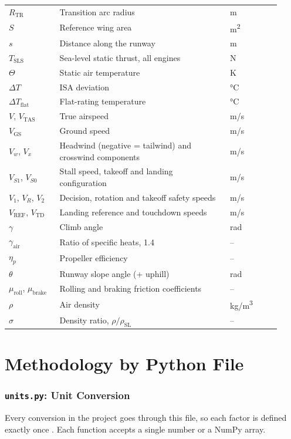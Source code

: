 \documentclass[11pt,letterpaper]{article}
\numberwithin{equation}{section}
\newcommand{\code}[1]{\textmd{\texttt{#1}}}
\begin{document}
\begin{longtable}{@{}p{0.17\linewidth}p{0.58\linewidth}p{0.17\linewidth}@{}}
$R_\text{TR}$ & Transition arc radius & \si{m}\\
$S$ & Reference wing area & \si{m^2}\\
$s$ & Distance along the runway & \si{m}\\
$T_\text{SLS}$ & Sea-level static thrust, all engines & \si{N}\\
$\Theta$ & Static air temperature & \si{K}\\
$\Delta T$ & ISA deviation & \si{\celsius}\\
$\Delta T_\text{flat}$ & Flat-rating temperature & \si{\celsius}\\
$V$, $V_\text{TAS}$ & True airspeed & \si{m/s}\\
$V_\text{GS}$ & Ground speed & \si{m/s}\\
$V_w$, $V_x$ & Headwind (negative = tailwind) and crosswind components & \si{m/s}\\
$V_{S1}$, $V_{S0}$ & Stall speed, takeoff and landing configuration & \si{m/s}\\
$V_1$, $V_R$, $V_2$ & Decision, rotation and takeoff safety speeds & \si{m/s}\\
$V_\text{REF}$, $V_\text{TD}$ & Landing reference and touchdown speeds & \si{m/s}\\
$\gamma$ & Climb angle & \si{rad}\\
$\gamma_\text{air}$ & Ratio of specific heats, 1.4 & --\\
$\eta_p$ & Propeller efficiency & --\\
$\theta$ & Runway slope angle (+ uphill) & \si{rad}\\
$\mu_\text{roll}$, $\mu_\text{brake}$ & Rolling and braking friction coefficients & --\\
$\rho$ & Air density & \si{kg/m^3}\\
$\sigma$ & Density ratio, $\rho/\rho_\text{SL}$ & --\\
\end{longtable}

\clearpage
\part{Methodology by Python File}
\clearpage

\section{\code{units.py}: Unit Conversion}\label{sec:units}
Every conversion in the project goes through this file, so each factor is defined exactly once \cite{NIST-811}. Each function accepts a single number or a NumPy array.
\end{document}
